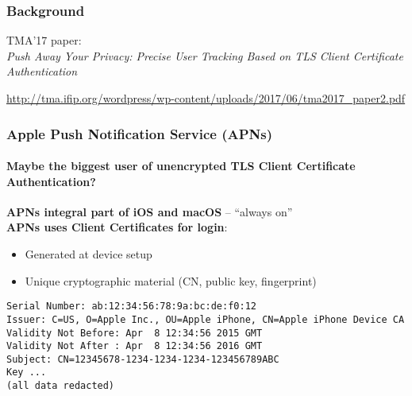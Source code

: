 \begin{frame}[fragile]
\frametitle{Background}

TMA'17 paper: \\
\textit{Push Away Your Privacy: Precise User Tracking Based on TLS Client Certificate Authentication}

\url{http://tma.ifip.org/wordpress/wp-content/uploads/2017/06/tma2017_paper2.pdf}

\end{frame}
\clearpage


\begin{frame}[fragile]
\frametitle{Apple Push Notification Service (APNs)}
\framesubtitle{Maybe the biggest user of unencrypted TLS Client Certificate Authentication?}

\textbf{APNs integral part of iOS and macOS} -- ``always on''\\

\textbf{APNs uses Client Certificates for login}:\\
\begin{itemize}
\item Generated at device setup
\item Unique cryptographic material (CN, public key, fingerprint)
\end{itemize}

\begin{verbatim}
Serial Number: ab:12:34:56:78:9a:bc:de:f0:12
Issuer: C=US, O=Apple Inc., OU=Apple iPhone, CN=Apple iPhone Device CA
Validity Not Before: Apr  8 12:34:56 2015 GMT
Validity Not After : Apr  8 12:34:56 2016 GMT
Subject: CN=12345678-1234-1234-1234-123456789ABC
Key ...
(all data redacted)
\end{verbatim}
\end{frame}
\clearpage


